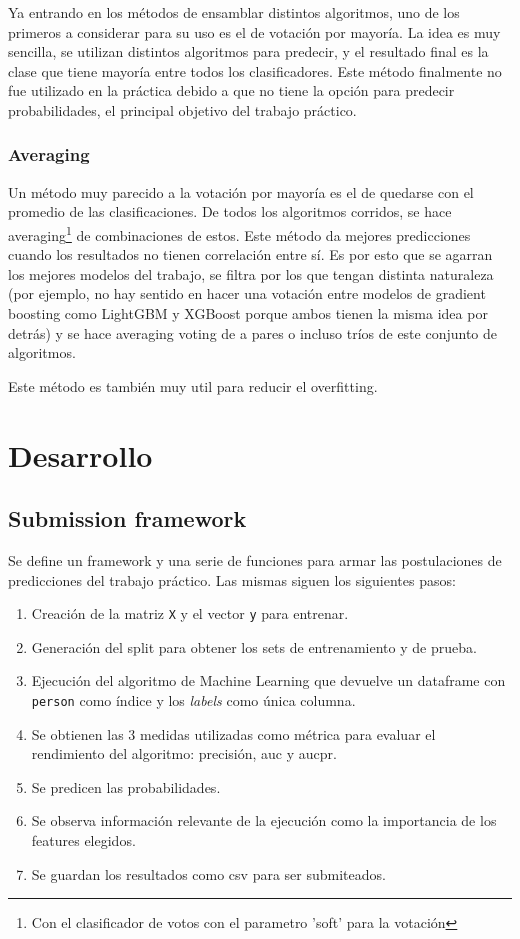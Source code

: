 \documentclass[a4paper]{article}
\begin{document}
Ya entrando en los métodos de ensamblar distintos algoritmos, uno de los primeros a considerar para su uso es el de votación por mayoría. La idea es muy sencilla, se utilizan distintos algoritmos para predecir, y el resultado final es la clase que tiene mayoría entre todos los clasificadores. Este método finalmente no fue utilizado en la práctica debido a que no tiene la opción para predecir probabilidades, el principal objetivo del trabajo práctico.

\subsubsection{Averaging}

Un método muy parecido a la votación por mayoría es el de quedarse con el promedio de las clasificaciones. De todos los algoritmos corridos, se hace averaging\footnote{Con el clasificador de votos con el parametro 'soft' para la votación} de combinaciones de estos. Este método da mejores predicciones cuando los resultados no tienen correlación entre sí. Es por esto que se agarran los mejores modelos del trabajo, se filtra por los que tengan distinta naturaleza (por ejemplo, no hay sentido en hacer una votación entre modelos de gradient boosting como LightGBM y XGBoost porque ambos tienen la misma idea por detrás) y se hace averaging voting de a pares o incluso tríos de este conjunto de algoritmos.

Este método es también muy util para reducir el overfitting.

\section{Desarrollo}

\subsection{Submission framework}

Se define un framework y una serie de funciones para armar las postulaciones de predicciones del trabajo práctico. Las mismas siguen los siguientes pasos:

\begin{enumerate}
	\item Creación de la matriz \texttt{X} y el vector \texttt{y} para entrenar.
	\item Generación del split para obtener los sets de entrenamiento y de prueba.
	\item Ejecución del algoritmo de Machine Learning que devuelve un dataframe con \texttt{person} como índice y los \textit{labels} como única columna.
	\item Se obtienen las 3 medidas utilizadas como métrica para evaluar el rendimiento del algoritmo: precisión, auc y aucpr.
	\item Se predicen las probabilidades.
	\item Se observa información relevante de la ejecución como la importancia de los features elegidos.
	\item Se guardan los resultados como csv para ser submiteados.
\end{enumerate}
\end{document}
